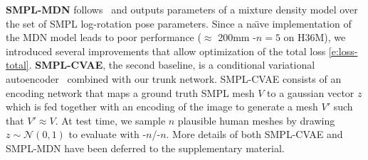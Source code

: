 \textbf{SMPL-MDN} follows~\cite{li19generating} and outputs parameters of a mixture density model over the set of SMPL log-rotation pose parameters. 
Since a na\"{\i}ve implementation of the MDN model leads to poor performance ($\approx$ 200mm \MPJPE-$n=5$ on H36M), we introduced several improvements that allow optimization of the total loss \cref{e:loss-total}.
\textbf{SMPL-CVAE}, the second baseline, is a conditional variational autoencoder~\cite{sohn2015cvae} combined with our trunk network.
SMPL-CVAE consists of an encoding network that maps a ground truth SMPL mesh $V$ to a gaussian vector $z$ which is fed together with an encoding of the image to generate a mesh $V'$ such that $V' \approx V$. At test time, we sample $n$ plausible human meshes by drawing $z \sim \mathcal{N}(0, 1)$ to evaluate with \MPJPE-$n$/\RE-$n$.
More details of both SMPL-CVAE and SMPL-MDN have been deferred to the supplementary material.

